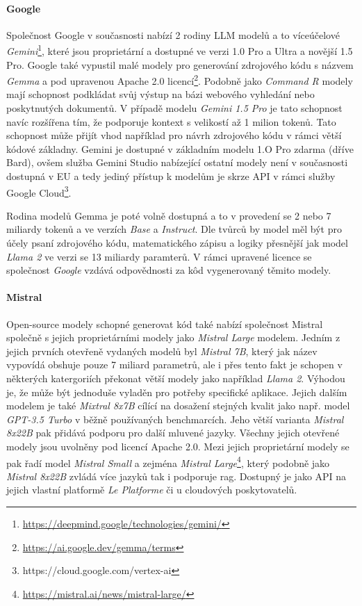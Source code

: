 \documentclass[czech, ma, kiv, he, iso690alph, pdf, viewonly]{fasthesis}
\begin{document}
    \paragraph{Google} Společnost Google v současnosti nabízí 2 rodiny LLM modelů a to víceúčelové \textit{Gemini}\footnote{\url{https://deepmind.google/technologies/gemini/}}, které jsou proprietární a dostupné ve verzi 1.0 Pro a Ultra a novější 1.5 Pro. Google také vypustil malé modely pro generování zdrojového kódu s názvem \textit{Gemma} a pod upravenou Apache 2.0 licencí\footnote{\url{https://ai.google.dev/gemma/terms}}. Podobně jako \textit{Command R} modely mají schopnost podkládat svůj výstup na bázi webového vyhledání nebo poskytnutých dokumentů. V případě modelu \textit{Gemini 1.5 Pro} je tato schopnost navíc rozšířena tím, že podporuje kontext s velikostí až 1 milion tokenů. Tato schopnost může přijít vhod například pro návrh zdrojového kódu v rámci větší kódové základny. Gemini je dostupné v základním modelu 1.O Pro zdarma (dříve Bard), ovšem služba Gemini Studio nabízející ostatní modely není v současnosti dostupná v EU a tedy jediný přístup k modelům je skrze API v rámci služby Google Cloud\footnote{https://cloud.google.com/vertex-ai}.

    Rodina modelů Gemma je poté volně dostupná a to v provedení se 2 nebo 7 miliardy tokenů a ve verzích \textit{Base} a \textit{Instruct}. Dle tvůrců by model měl být pro účely psaní zdrojového kódu, matematického zápisu a logiky přesnější jak model \textit{Llama 2} ve verzi se 13 miliardy paramterů. \cite{gemma_introduction} V rámci upravené licence se společnost \textit{Google} vzdává odpovědnosti za kôd vygenerovaný těmito modely.

    \paragraph{Mistral} Open-source modely schopné generovat kód také nabízí společnost Mistral společně s jejich proprietárními modely jako \textit{Mistral Large} modelem. Jedním z jejich prvních otevřeně vydaných modelů byl \textit{Mistral 7B}, který jak název vypovídá obshuje pouze 7 miliard parametrů, ale i přes tento fakt je schopen v některých katergoriích překonat větší modely jako například \textit{Llama 2}. \cite{jiang2023mistral} Výhodou je, že může být jednoduše vyladěn pro potřeby specifické aplikace. Jejich dalším modelem je také \textit{Mixtral 8x7B} cílící na dosažení stejných kvalit jako např. model \textit{GPT-3.5 Turbo} v běžně používaných benchmarcích. Jeho větší varianta \textit{Mistral 8x22B} pak přidává podporu pro další mluvené jazyky. \cite{jiang2024mixtral} Všechny jejich otevřené modely jsou uvolněny pod licencí Apache 2.0. Mezi jejich proprietární modely se pak řadí model \textit{Mistral Small} a zejména \textit{Mistral Large}\footnote{\url{https://mistral.ai/news/mistral-large/}}, který podobně jako \textit{Mistral 8x22B} zvládá více jazyků tak i podporuje \Gls{rag}. Dostupný je jako API na jejich vlastní platformě \textit{Le Platforme} či u cloudových poskytovatelů.
\end{document}
